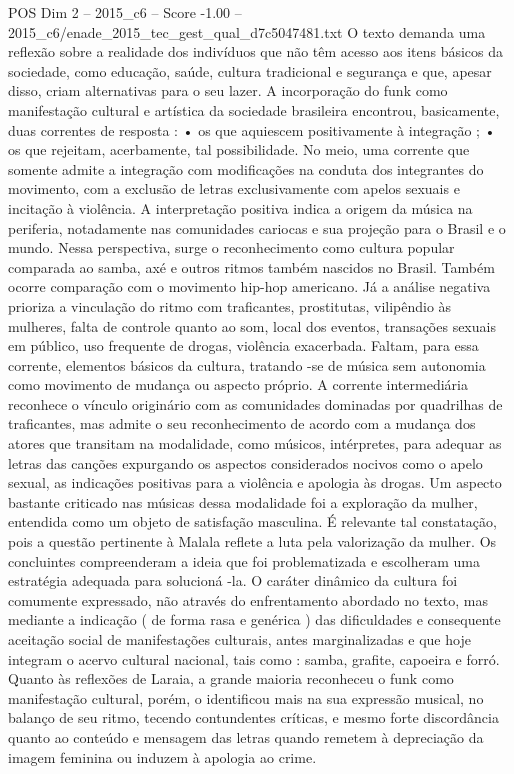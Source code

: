\begin{textsample}{POS Dim 2 – 2015\_c6 – Score -1.00 – 2015\_c6/enade\_2015\_tec\_gest\_qual\_d7c5047481.txt}
O texto demanda uma reflexão sobre a realidade dos indivíduos que não têm acesso aos itens básicos da sociedade, como educação, saúde, cultura tradicional e segurança e que, apesar disso, criam alternativas para o seu lazer.
A incorporação do funk como manifestação cultural e artística da sociedade brasileira encontrou, basicamente, duas correntes de resposta : • os que aquiescem positivamente à integração ; • os que rejeitam, acerbamente, tal possibilidade.
No meio, uma corrente que somente admite a integração com modificações na conduta dos integrantes do movimento, com a exclusão de letras exclusivamente com apelos sexuais e incitação à violência.
A interpretação positiva indica a origem da música na periferia, notadamente nas comunidades cariocas e sua projeção para o Brasil e o mundo.
Nessa perspectiva, surge o reconhecimento como cultura popular comparada ao samba, axé e outros ritmos também nascidos no Brasil.
Também ocorre comparação com o movimento hip-hop americano.
Já a análise negativa prioriza a vinculação do ritmo com traficantes, prostitutas, vilipêndio às mulheres, falta de controle quanto ao som, local dos eventos, transações sexuais em público, uso frequente de drogas, violência exacerbada.
Faltam, para essa corrente, elementos básicos da cultura, tratando -se de música sem autonomia como movimento de mudança ou aspecto próprio.
A corrente intermediária reconhece o vínculo originário com as comunidades dominadas por quadrilhas de traficantes, mas admite o seu reconhecimento de acordo com a mudança dos atores que transitam na modalidade, como músicos, intérpretes, para adequar as letras das canções expurgando os aspectos considerados nocivos como o apelo sexual, as indicações positivas para a violência e apologia às drogas.
Um aspecto bastante criticado nas músicas dessa modalidade foi a exploração da mulher, entendida como um objeto de satisfação masculina.
É relevante tal constatação, pois a questão pertinente à Malala reflete a luta pela valorização da mulher.
Os concluintes compreenderam a ideia que foi problematizada e escolheram uma estratégia adequada para solucioná -la.
O caráter dinâmico da cultura foi comumente expressado, não através do enfrentamento abordado no texto, mas mediante a indicação ( de forma rasa e genérica ) das dificuldades e consequente aceitação social de manifestações culturais, antes marginalizadas e que hoje integram o acervo cultural nacional, tais como : samba, grafite, capoeira e forró.
Quanto às reflexões de Laraia, a grande maioria reconheceu o funk como manifestação cultural, porém, o identificou mais na sua expressão musical, no balanço de seu ritmo, tecendo contundentes críticas, e mesmo forte discordância quanto ao conteúdo e mensagem das letras quando remetem à depreciação da imagem feminina ou induzem à apologia ao crime.

\end{textsample}

